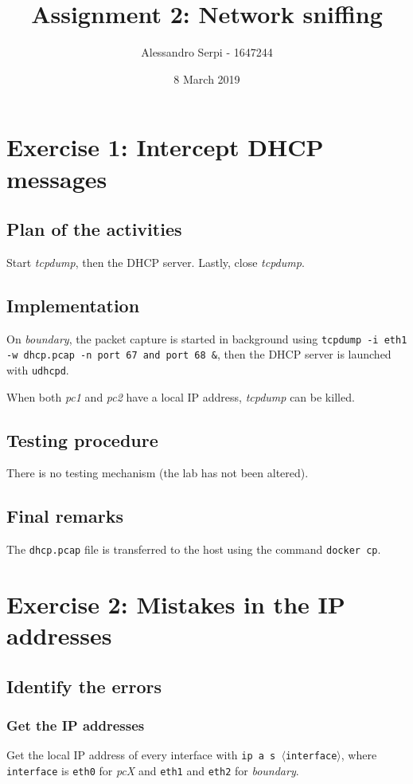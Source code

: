 \documentclass{homework}
\title{Assignment 2: Network sniffing}
\author{Alessandro Serpi - 1647244}
\date{8 March 2019}
\newcommand{\mt}{\texttt}
\begin{document}
    
    \maketitle
    
    
    \section{Exercise 1: Intercept DHCP messages}
    
    \subsection{Plan of the activities}
    Start \textit{tcpdump}, then the DHCP server. Lastly, close \textit{tcpdump}.
    
    \subsection{Implementation}
    On \textit{boundary}, the packet capture is started in background using \mt{tcpdump -i eth1 -w dhcp.pcap -n port 67 and port 68 \&}, then the DHCP server is launched  with \mt{udhcpd}.
    
    When both \textit{pc1} and \textit{pc2} have a local IP address, \textit{tcpdump} can be killed.
    
    \subsection{Testing procedure}
    There is no testing mechanism (the lab has not been altered).
    
    \subsection{Final remarks}
    The \mt{dhcp.pcap} file is transferred to the host using the command \mt{docker cp}.
    
    
    \section{Exercise 2: Mistakes in the IP addresses}
    
    \subsection{Identify the errors}
    
    \subsubsection{Get the IP addresses}
    Get the local IP address of every interface with \mt{ip a s $\langle$interface$\rangle$}, where \mt{interface} is \mt{eth0} for \textit{pcX} and \mt{eth1} and \mt{eth2} for \textit{boundary}.
    
\end{document}
